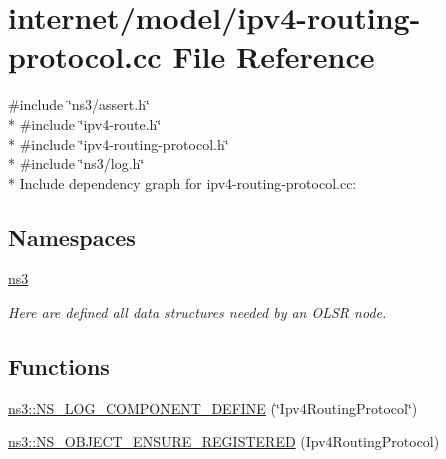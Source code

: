 \hypertarget{ipv4-routing-protocol_8cc}{}\section{internet/model/ipv4-\/routing-\/protocol.cc File Reference}
\label{ipv4-routing-protocol_8cc}
{\ttfamily \#include \char`\"{}ns3/assert.\+h\char`\"{}}\\*
{\ttfamily \#include \char`\"{}ipv4-\/route.\+h\char`\"{}}\\*
{\ttfamily \#include \char`\"{}ipv4-\/routing-\/protocol.\+h\char`\"{}}\\*
{\ttfamily \#include \char`\"{}ns3/log.\+h\char`\"{}}\\*
Include dependency graph for ipv4-\/routing-\/protocol.cc\+:
\subsection*{Namespaces}
\begin{DoxyCompactItemize}
\item 
 \hyperlink{namespacens3}{ns3}
\begin{DoxyCompactList}\small\item\em Here are defined all data structures needed by an O\+L\+SR node. \end{DoxyCompactList}\end{DoxyCompactItemize}
\subsection*{Functions}
\begin{DoxyCompactItemize}
\item 
\hyperlink{namespacens3_a15f8b4015e72712f1fccf896761fafea}{ns3\+::\+N\+S\+\_\+\+L\+O\+G\+\_\+\+C\+O\+M\+P\+O\+N\+E\+N\+T\+\_\+\+D\+E\+F\+I\+NE} (\char`\"{}Ipv4\+Routing\+Protocol\char`\"{})
\item 
\hyperlink{namespacens3_a473b7285dcf1532e74f7609734256356}{ns3\+::\+N\+S\+\_\+\+O\+B\+J\+E\+C\+T\+\_\+\+E\+N\+S\+U\+R\+E\+\_\+\+R\+E\+G\+I\+S\+T\+E\+R\+ED} (Ipv4\+Routing\+Protocol)
\end{DoxyCompactItemize}
